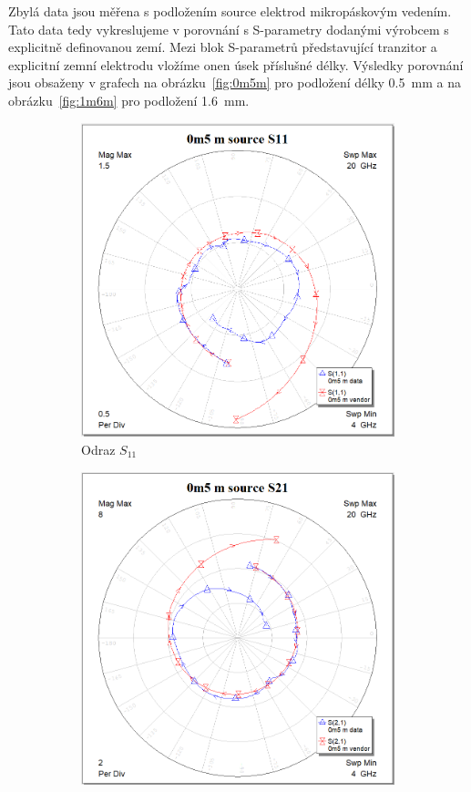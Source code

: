 \documentclass[11pt,a4paper]{article}
\begin{document}
Zbylá data jsou měřena s podložením source elektrod mikropáskovým vedením. Tato data tedy vykreslujeme v porovnání s S-parametry dodanými výrobcem s explicitně definovanou zemí. Mezi blok S-parametrů představující tranzitor a explicitní zemní elektrodu vložíme onen úsek příslušné délky. Výsledky porovnání jsou obsaženy v grafech na obrázku~\ref{fig:0m5m} pro podložení délky 0.5~mm a na obrázku~\ref{fig:1m6m} pro podložení 1.6~mm.
\begin{figure}[!ht]
    \centering
\begin{subfigure}{0.45\textwidth}
    \centering
    \includegraphics[width=\textwidth]{src/0m5m-S11.png}
    \caption{Odraz $S_{11}$}
\end{subfigure}
\begin{subfigure}{0.45\textwidth}
    \centering
    \includegraphics[width=\textwidth]{src/0m5m-S21.png}

\end{subfigure}
\end{figure}
\end{document}
